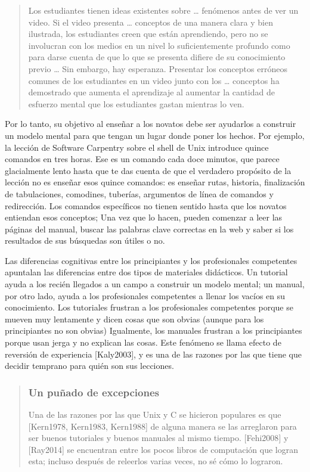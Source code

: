 \documentclass[
]{book}
\begin{document}
\begin{quote}
Los estudiantes tienen ideas existentes sobre \ldots{} fenómenos antes de ver un video. Si el video presenta \ldots{} conceptos de una manera clara y bien ilustrada, los estudiantes creen que están aprendiendo, pero no se involucran con los medios en un nivel lo
suficientemente profundo como para darse cuenta de que lo que se presenta difiere de su conocimiento previo \ldots{} Sin embargo, hay esperanza. Presentar los conceptos erróneos comunes de los estudiantes en un video junto con los \ldots{} conceptos ha demostrado
que aumenta el aprendizaje al aumentar la cantidad de esfuerzo mental que los estudiantes gastan mientras lo ven.
\end{quote}

Por lo tanto, su objetivo al enseñar a los novatos debe ser ayudarlos a construir un modelo mental para que tengan un lugar donde poner los hechos. Por ejemplo, la lección de Software Carpentry sobre el shell de Unix introduce quince comandos en tres horas. Ese es un comando cada doce minutos, que parece glacialmente lento hasta que te das cuenta de que el verdadero propósito de la lección no es enseñar esos quince comandos: es enseñar rutas, historia, finalización de tabulaciones, comodines, tuberías, argumentos de línea de comandos y redirección. Los comandos específicos no tienen sentido hasta que los novatos entiendan esos conceptos; Una vez que lo hacen, pueden comenzar a leer las páginas del manual, buscar las palabras clave correctas en la web y saber si los resultados de sus búsquedas son útiles o no.

Las diferencias cognitivas entre los principiantes y los profesionales competentes apuntalan las diferencias entre dos tipos de materiales didácticos. Un tutorial ayuda a los recién llegados a un campo a construir un modelo mental; un manual, por otro lado, ayuda a los profesionales competentes a llenar los vacíos en su conocimiento. Los tutoriales frustran a los profesionales competentes porque se mueven muy lentamente y dicen cosas que son obvias (aunque para los principiantes no son obvias) Igualmente, los manuales frustran a los principiantes porque usan jerga y no explican las cosas. Este fenómeno se llama efecto de reversión de experiencia {[}Kaly2003{]}, y es una de las razones por las que tiene que decidir temprano para quién son sus lecciones.

\begin{quote}
\hypertarget{un-puuxf1ado-de-excepciones}{%
\subsubsection{Un puñado de excepciones}\label{un-puuxf1ado-de-excepciones}}

Una de las razones por las que Unix y C se hicieron populares es que {[}Kern1978, Kern1983, Kern1988{]} de alguna manera se las arreglaron para ser buenos tutoriales y buenos manuales al mismo tiempo. {[}Fehi2008{]} y {[}Ray2014{]} se encuentran entre los pocos libros de computación que logran esta; incluso después de releerlos varias veces, no sé cómo lo lograron.
\end{quote}
\end{document}
